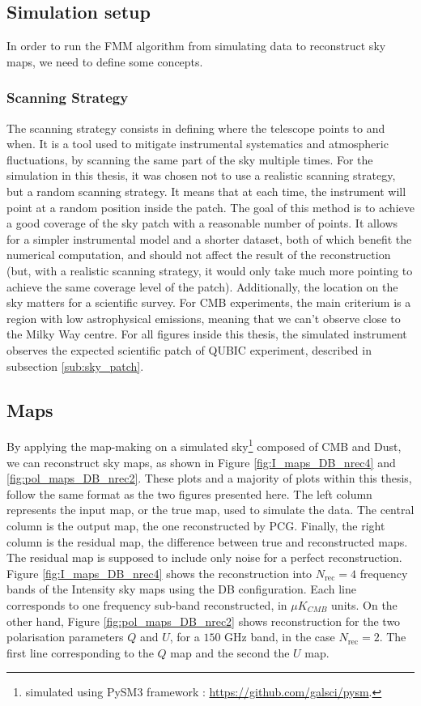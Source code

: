 \documentclass[../../thesis.tex]{subfiles}
\begin{document}
\subsection{Simulation setup}

In order to run the FMM algorithm from simulating data to reconstruct sky maps, we need to define some concepts. 

\subsubsection{Scanning Strategy} \label{subsub:scanning_strategy}

The scanning strategy consists in defining where the telescope points to and when. It is a tool used to mitigate instrumental systematics and atmospheric fluctuations, by scanning the same part of the sky multiple times. For the simulation in this thesis, it was chosen not to use a realistic scanning strategy, but a random scanning strategy. It means that at each time, the instrument will point at a random position inside the patch. The goal of this method is to achieve a good coverage of the sky patch with a reasonable number of points. It allows for a simpler instrumental model and a shorter dataset, both of which benefit the numerical computation, and should not affect the result of the reconstruction (but, with a realistic scanning strategy, it would only take much more pointing to achieve the same coverage level of the patch).
Additionally, the location on the sky matters for a scientific survey. For CMB experiments, the main criterium is a region with low astrophysical emissions, meaning that we can't observe close to the Milky Way centre. For all figures inside this thesis, the simulated instrument observes the expected scientific patch of QUBIC experiment, described in subsection \ref{sub:sky_patch}.

\subsection{Maps}

By applying the map-making on a simulated sky\footnote{simulated using PySM3 framework : \url{https://github.com/galsci/pysm}.} composed of CMB and Dust, we can reconstruct sky maps, as shown in Figure \ref{fig:I_maps_DB_nrec4} and \ref{fig:pol_maps_DB_nrec2}. 
These plots and a majority of plots within this thesis, follow the same format as the two figures presented here. The left column represents the input map, or the true map, used to simulate the data. The central column is the output map, the one reconstructed by PCG. Finally, the right column is the residual map, the difference between true and reconstructed maps. The residual map is supposed to include only noise for a perfect reconstruction.
Figure \ref{fig:I_maps_DB_nrec4} shows the reconstruction into $N_\text{rec}=4$ frequency bands of the Intensity sky maps  using the DB configuration. Each line corresponds to one frequency sub-band reconstructed, in $\mu K_{CMB}$ units. On the other hand, Figure \ref{fig:pol_maps_DB_nrec2} shows reconstruction for the two polarisation parameters $Q$ and $U$, for a $150$ GHz band, in the case $N_\text{rec}=2$. The first line corresponding to the $Q$ map and the second the $U$ map.
\end{document}
